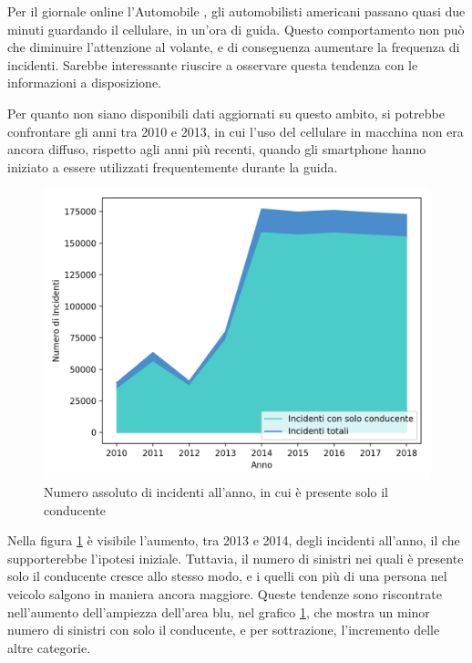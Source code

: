 \documentclass[a4paper]{report}
\begin{document}
Per il giornale online l'Automobile \cite{AUTOMOBILE:1}, gli automobilisti americani 
passano quasi due minuti guardando il cellulare, in un'ora di guida. 
Questo comportamento non può che diminuire l'attenzione al volante, e di conseguenza 
aumentare la frequenza di incidenti. 
Sarebbe interessante riuscire a osservare questa tendenza con le 
informazioni a disposizione. 

Per quanto non siano disponibili dati aggiornati su questo ambito, si potrebbe confrontare gli 
anni tra 2010 e 2013, in cui l'uso del cellulare in macchina non era ancora diffuso, 
rispetto agli anni più recenti, quando gli smartphone hanno iniziato a essere utilizzati 
frequentemente durante la guida. 

\begin{figure}
    \includegraphics[width=\linewidth]{../src/incidenti/incidenti_senza_coords/anno/incremento_incidenti.png}
    \caption{Numero assoluto di incidenti all'anno, in cui è presente solo il conducente}
    \label{fig:incremento-incidenti}
\end{figure}

Nella figura \ref{fig:incremento-incidenti} è visibile l'aumento, tra 2013 e 2014, degli 
incidenti all'anno, il che supporterebbe l'ipotesi iniziale. 
Tuttavia, il numero di sinistri nei quali è presente solo il conducente 
cresce allo stesso modo, e i quelli con più di una persona nel veicolo 
salgono in maniera ancora maggiore. 
Queste tendenze sono riscontrate nell'aumento dell'ampiezza dell'area blu, nel grafico 
\ref{fig:incremento-incidenti}, che mostra un minor numero di sinistri con solo il conducente, 
e per sottrazione, l'incremento delle altre categorie. 
\end{document}
